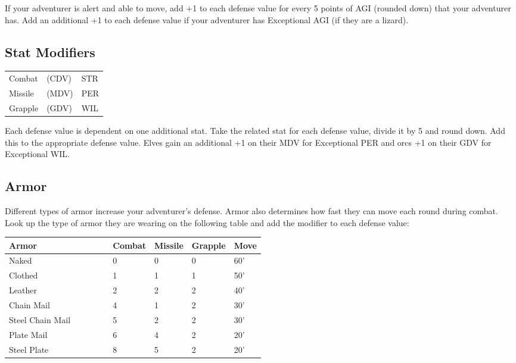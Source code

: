 If your adventurer is alert and able to move, add +1 to each defense value for every 5 points of AGI (rounded down) that your adventurer has. Add an additional +1 to each defense value if your adventurer has Exceptional AGI (if they are a lizard).
\subsection{Stat Modifiers}


\begin{normbox}

\small
\begin{tabular}{@{}l l | l}
Combat & (CDV) & STR\\
Missile & (MDV) & PER\\
Grapple & (GDV) & WIL\\
\end{tabular}
\end{normbox}

Each defense value is dependent on one additional stat. Take the related stat for each defense value, divide it by 5 and round down. Add this to the appropriate defense value. Elves gain an additional +1 on their MDV for Exceptional PER and orcs +1 on their GDV for Exceptional WIL.
\subsection{Armor}

Different types of armor increase your adventurer's defense. Armor also determines how fast they can move each round during combat. Look up the type of armor they are wearing on the following table and add the modifier to each defense value:

\begin{normbox}
\small
\begin{tabular}{@{}l p{0.125\linewidth} p{0.125\linewidth} p{0.125\linewidth} p{0.125\linewidth}}
\textbf{Armor} & \textbf{Combat} & \textbf{Missile} & \textbf{Grapple} & \textbf{Move}\\
\midrule
Naked & 0 & 0 & 0 & 60'\\
Clothed & 1 & 1 & 1 & 50'\\
Leather & 2 & 2 & 2 & 40'\\
Chain Mail & 4 & 1 & 2 & 30'\\
Steel Chain Mail  & 5 & 2 & 2 & 30'\\
Plate Mail & 6 & 4 & 2 & 20'\\
Steel Plate & 8 & 5 & 2 & 20'\\
\end{tabular}
\end{normbox}

